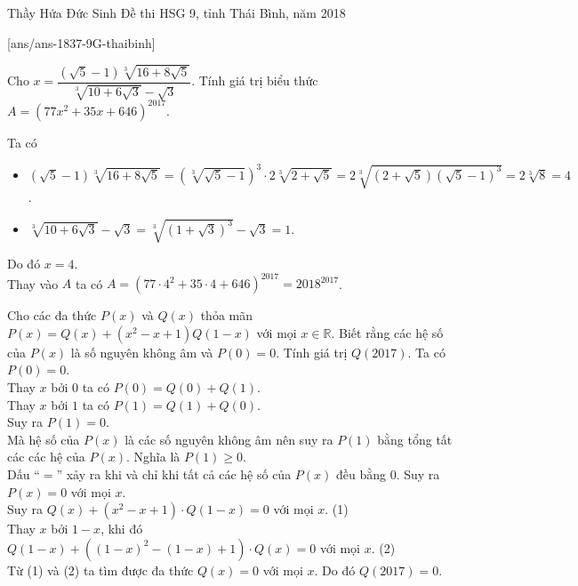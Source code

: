 	\begin{name}
		{Thầy  Hứa Đức Sinh}
		{Đề thi HSG 9, tỉnh Thái Bình, năm 2018}
	\end{name}
\setcounter{ex}{0}
[ans/ans-1837-9G-thaibinh]
\begin{ex}%
	Cho $x=\dfrac{(\sqrt{5}-1)\sqrt[3]{16+8\sqrt{5}}}{\sqrt[3]{10+6\sqrt{3}}-\sqrt{3}}$. Tính giá trị biểu thức $A=(77x^2+35x+646)^{2017}$.
	\loigiai
	{
		Ta có
		\begin{itemize}
			\item $(\sqrt{5}-1)\sqrt[3]{16+8\sqrt{5}}=(\sqrt[3]{\sqrt{5}-1})^3 \cdot 2\sqrt[3]{2+\sqrt{5}} = 2\sqrt[3]{(2+\sqrt{5})(\sqrt{5}-1)^3}=2\sqrt[3]{8}=4  $.
			\item $\sqrt[3]{10+6\sqrt{3}}-\sqrt{3}=\sqrt[3]{\left(1+\sqrt{3}\right)^3}-\sqrt{3}=1$.
		\end{itemize}
		Do đó $x=4$.\\
		Thay vào $A$ ta có $A=(77 \cdot 4^2 + 35 \cdot 4 +646)^{2017} = 2018^{2017}$.
	}
\end{ex}

\begin{ex}%
	Cho các đa thức $P(x)$ và $Q(x)$ thỏa mãn $P(x)=Q(x)+(x^2-x+1)Q(1-x)$ với mọi $x\in \mathbb{R}$. Biết rằng các hệ số của $P(x)$ là số nguyên không âm và $P(0)=0$. Tính giá trị $Q(2017)$.
	\loigiai
	{
     	Ta có $P(0)=0$.\\
     	Thay $x$ bởi $0$ ta có $P(0)=Q(0)+Q(1)$.\\
     	Thay $x$ bởi $1$ ta có $P(1)=Q(1)+Q(0)$.\\
     	Suy ra $P(1)=0$.\\
     	Mà hệ số của $P(x)$ là các số nguyên không âm nên suy ra $P(1)$ bằng tổng tất các các hệ của $P(x)$. Nghĩa là $P(1) \ge 0$.\\
     	Dấu ``$=$'' xảy ra khi và chỉ khi tất cả các hệ số của $P(x)$ đều bằng $0$. Suy ra $P(x)=0$ với mọi $x$.\\
     	Suy ra $Q(x) + (x^2-x+1) \cdot Q(1-x) = 0$ với mọi $x$. \hfill (1)\\
     	Thay $x$ bởi $1-x$, khi đó
     	$Q(1-x) + ( (1-x)^2 - (1-x) +1 ) \cdot Q(x) = 0$ với mọi $x$. \hfill (2)\\
     	Từ (1) và (2) ta tìm được đa thức $Q(x)=0$ với mọi $x$. Do đó $Q(2017)=0$.
	}
\end{ex}

